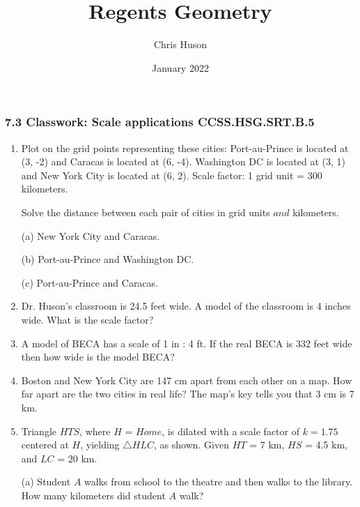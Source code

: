 \documentclass[12pt, twoside]{article}
\title{Regents Geometry}
\author{Chris Huson}
\date{January 2022}
\begin{document}
\subsubsection*{7.3 Classwork: Scale applications \hfill CCSS.HSG.SRT.B.5}
\begin{enumerate}

\item Plot on the grid points representing these cities: Port-au-Prince is located at (3, -2) and Caracas is located at (6, -4). Washington DC is located at (3, 1) and New York City is located at (6, 2). Scale factor: 1 grid unit = 300 kilometers.

Solve the distance between each pair of cities in grid units $and$ kilometers.

(a) New York City and Caracas.

(b) Port-au-Prince and Washington DC.

(c) Port-au-Prince and Caracas.

\begin{multicols}{2}
\end{multicols}

\item Dr. Huson's classroom is 24.5 feet wide. A model of the classroom is 4 inches wide. What is the scale factor?\vspace{2cm}

\item A model of BECA has a scale of 1 in : 4 ft. If the real BECA is 332 feet wide then how wide is the model BECA?\vspace{2cm}

\item Boston and New York City are 147 cm apart from each other on a map. How far apart are the two cities in real life? The map's key tells you that 3 cm is 7 km.

\newpage
\item Triangle $HTS$, where $H$ = $Home$, is dilated with a scale factor of $k=1.75$ centered at $H$, yielding $\triangle HLC$, as shown. Given $HT$ = 7 km, $HS$ = 4.5 km, and $LC$ = 20 km.

(a) Student $A$ walks from school to the theatre and then walks to the library. How many kilometers did student $A$ walk?


\end{enumerate}
\end{document}
